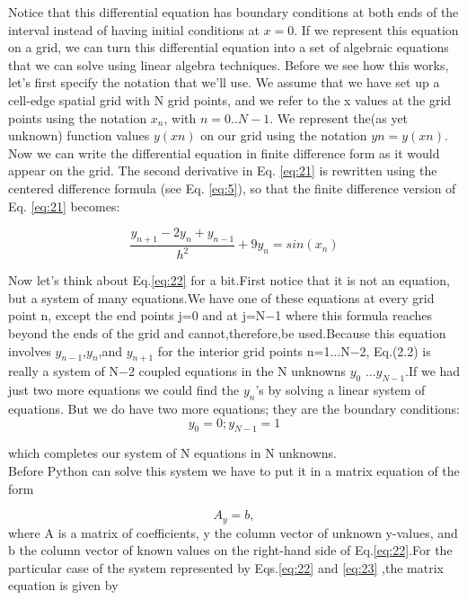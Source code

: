 \documentclass{book}
\theoremstyle{plain}
\theoremstyle{definition}
\numberwithin{exm}{chapter}
\theoremstyle{remark}
\theoremstyle{summary}
\theoremstyle{overview}
\begin{document}
Notice that this differential equation has boundary conditions at both ends of the interval instead of having initial conditions at $x = 0$. If we represent this equation on a grid, we can turn this differential equation into a set of algebraic equations that we can solve using linear algebra techniques. Before we see how this works, let\rq s first specify the notation that we\rq ll use. We assume that we have set up a cell-edge spatial grid with N grid points, and we refer to the x values at the grid points using the notation $x_n$, with $n = 0..N−1$. We represent the(as yet unknown) function values $y(xn)$ on our grid using the notation $yn = y(xn)$. Now we can write the differential equation in finite difference form as it would appear on the grid. The second derivative in Eq. \eqref{eq:21} is rewritten using the centered difference formula (see Eq. \eqref{eq:5}), so that the finite difference version of Eq. \eqref{eq:21} becomes:

\begin{equation} \label{eq:22}
	\frac{y_{n+1}-2y_n+y_{n-1}}{h^2}+9y_n = sin(x_n)
\end{equation}


Now let\rq s think about Eq.\eqref{eq:22} for a bit.First notice that it is not an equation, but a system of many equations.We have one of these equations at every grid point n, except the end points j=0 and at j=N−1 where this formula reaches beyond the ends of the grid and cannot,therefore,be used.Because this equation involves $y_{n−1}$,$y_n$,and $y_{n+1}$ for the interior grid points n=1...N−2, Eq.(2.2) is really a  system of N−2 coupled equations in the N unknowns $y_0$ ...$y_{N−1}$.If we had just two more equations we could find the $y_n$\rq s by solving a linear system of equations. But we do have two more equations; they are the boundary conditions:
\begin{equation} \label{eq:23}
	y_0 = 0 ; y_{N-1} = 1
\end{equation}

which completes our system of N equations in N unknowns.\\
 Before Python can solve this system we have to put it in a matrix equation of the form

\begin{equation} \label{eq:24}
	A_y=b,
\end{equation}
where A is a matrix of coefficients, y the column vector of unknown y-values, and b the column vector of known values on the right-hand side of Eq.\eqref{eq:22}.For the particular case of the system represented by Eqs.\eqref{eq:22} and \eqref{eq:23} ,the matrix equation is given by
\end{document}
